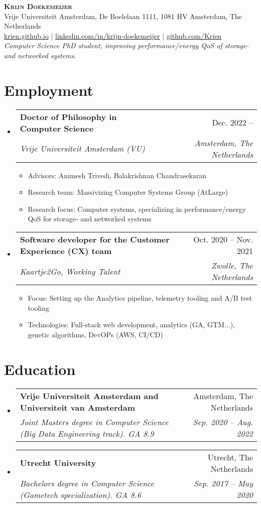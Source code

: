 \documentclass[letterpaper,11pt]{article}
\makeatletter
\newcommand{\resumeItem}[1]{
  \item\small{
    {#1 \vspace{-2pt}}
  }
}
\newcommand{\resumeSubheading}[4]{
  \vspace{-2pt}\item
    \begin{tabular*}{0.97\textwidth}[t]{l@{\extracolsep{\fill}}r}
      \textbf{#1} & #2 \\
      \textit{\small#3} & \textit{\small #4} \\
    \end{tabular*}\vspace{-7pt}
}
\newcommand{\resumeSubHeadingListStart}{\begin{itemize}[leftmargin=0.15in, label={}]}
\newcommand{\resumeSubHeadingListEnd}{\end{itemize}}
\newcommand{\resumeItemListStart}{\begin{itemize}}
\newcommand{\resumeItemListEnd}{\end{itemize}\vspace{-5pt}}
\makeatother
\begin{document}
\begin{center}
    \textbf{\Huge \scshape Krijn Doekemeijer} \\ \vspace{1pt}
    \small Vrije Universiteit Amsterdam, De Boelelaan 1111, 1081 HV Amsterdam, The Netherlands \\ \vspace{1pt}
    \href{https://krien.github.io/}{\underline{krien.github.io}} $|$
    \href{https://linkedin.com/in/krijn-doekemeijer-9692801aa}{\underline{linkedin.com/in/krijn-doekemeijer}} $|$
    \href{https://github.com/Krien}{\underline{github.com/Krien}} \\
    \textit{ Computer Science PhD student, improving performance/energy QoS of storage- and networked systems. } 
\end{center}

\section{Employment}
  \resumeSubHeadingListStart
    \resumeSubheading
      {Doctor of Philosophy in Computer Science}{Dec. 2022 --}
      {Vrije Universiteit Amsterdam (VU)}{Amsterdam, The Netherlands}
      \resumeItemListStart
      \resumeItem{ 
        Advisors: Animesh Trivedi, Balakrishnan Chandrasekaran
      }
      \resumeItem{ 
        Research team: Massivizing Computer Systems Group (AtLarge)
      }
      \resumeItem{
        Research focus: Computer systems, specializing in performance/energy QoS for storage- and networked systems
      }
      \resumeItemListEnd
    \resumeSubheading
      {Software developer for the Customer Experience (CX) team}{Oct. 2020 -- Nov. 2021}
      {Kaartje2Go, Working Talent}{Zwolle, The Netherlands}
      \resumeItemListStart
        \resumeItem{ 
          Focus: Setting up the Analytics pipeline, telemetry tooling and A/B test tooling
        }
        \resumeItem{
          Technologies: Full-stack web development, analytics (GA, GTM...), genetic algorithms, DevOPs (AWS, CI/CD)
        }
      \resumeItemListEnd

  \resumeSubHeadingListEnd

\section{Education}
\resumeSubHeadingListStart
    \resumeSubheading
    {Vrije Universiteit Amsterdam and Universiteit van Amsterdam}{Amsterdam, The Netherlands}
    {Joint Masters degree in Computer Science (Big Data Engineering track). GA 8.9}{Sep. 2020 -- Aug. 2022}
  \resumeSubheading
    {Utrecht University}{Utrecht, The Netherlands}
    {Bachelors degree in Computer Science (Gametech specialization). GA 8.6 }{Sep. 2017 -- May 2020}
\resumeSubHeadingListEnd
\end{document}
